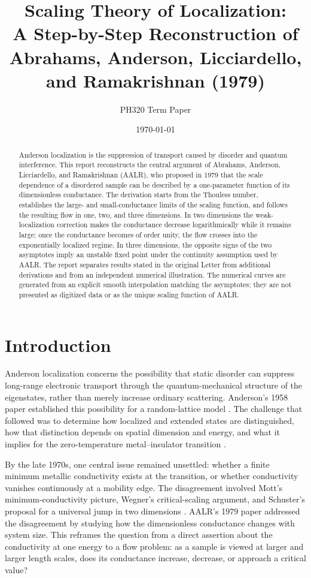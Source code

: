 \documentclass[11pt,a4paper]{article}
\title{Scaling Theory of Localization:\\A Step-by-Step Reconstruction of Abrahams, Anderson, Licciardello, and Ramakrishnan (1979)}
\author{PH320 Term Paper}
\date{\today}
\numberwithin{equation}{section}
\begin{document}
\maketitle

\begin{abstract}
Anderson localization is the suppression of transport caused by disorder and quantum interference. This report reconstructs the central argument of Abrahams, Anderson, Licciardello, and Ramakrishnan (AALR), who proposed in 1979 that the scale dependence of a disordered sample can be described by a one-parameter function of its dimensionless conductance. The derivation starts from the Thouless number, establishes the large- and small-conductance limits of the scaling function, and follows the resulting flow in one, two, and three dimensions. In two dimensions the weak-localization correction makes the conductance decrease logarithmically while it remains large; once the conductance becomes of order unity, the flow crosses into the exponentially localized regime. In three dimensions, the opposite signs of the two asymptotes imply an unstable fixed point under the continuity assumption used by AALR. The report separates results stated in the original Letter from additional derivations and from an independent numerical illustration. The numerical curves are generated from an explicit smooth interpolation matching the asymptotes; they are not presented as digitized data or as the unique scaling function of AALR.
\end{abstract}

\tableofcontents
\newpage

\section{Introduction}

Anderson localization concerns the possibility that static disorder can
suppress long-range electronic transport through the quantum-mechanical
structure of the eigenstates, rather than merely increase ordinary
scattering. Anderson's 1958 paper established this possibility for a
random-lattice model \cite{Anderson1958}. The challenge that followed was
to determine how localized and extended states are distinguished, how that
distinction depends on spatial dimension and energy, and what it implies
for the zero-temperature metal--insulator transition
\cite{Thouless1974,LeeRamakrishnan1985}.

By the late 1970s, one central issue remained unsettled: whether a finite
minimum metallic conductivity exists at the transition, or whether
conductivity vanishes continuously at a mobility edge. The disagreement
involved Mott's minimum-conductivity picture, Wegner's critical-scaling
argument, and Schuster's proposal for a universal jump in two dimensions
\cite{Mott1974,Wegner1976,Schuster1978,AALR1979}. AALR's 1979 paper addressed
the disagreement by studying how the dimensionless conductance changes
with system size. This reframes the question from a direct assertion about
the conductivity at one energy to a flow problem: as a sample is viewed at
larger and larger length scales, does its conductance increase, decrease,
or approach a critical value?
\end{document}
